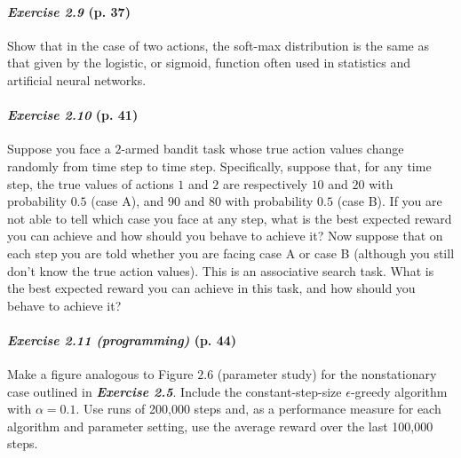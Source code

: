\documentclass[10pt,a4paper]{article}
\begin{document}
\paragraph{\textit{Exercise 2.9} (p. 37)} Show that in the case of two actions, the soft-max distribution is the same
as that given by the logistic, or sigmoid, function often used in statistics and artificial
neural networks.

\paragraph{\textit{Exercise 2.10} (p. 41)} Suppose you face a $2$-armed bandit task whose true action values change randomly from time step to time step. Specifically, suppose that, for any time step, the true values of actions $1$ and $2$ are respectively $10$ and $20$ with probability $0.5$ (case
A), and $90$ and $80$ with probability $0.5$ (case B). If you are not able to tell which case you face at any step, what is the best expected reward you can achieve and how should
you behave to achieve it? Now suppose that on each step you are told whether you are
facing case A or case B (although you still don't know the true action values). This is an associative search task. What is the best expected reward you can achieve in this task, and how should you behave to achieve it?

\paragraph{\textit{Exercise 2.11 (programming)} (p. 44)} Make a figure analogous to Figure $2.6$ (parameter study) for the nonstationary case outlined in \textbf{\textit{Exercise 2.5}}. Include the constant-step-size $\epsilon$-greedy algorithm with
$\alpha=0.1$. Use runs of 200,000 steps and, as a performance measure for each algorithm and parameter setting, use the average reward over the last 100,000 steps.
\end{document}
